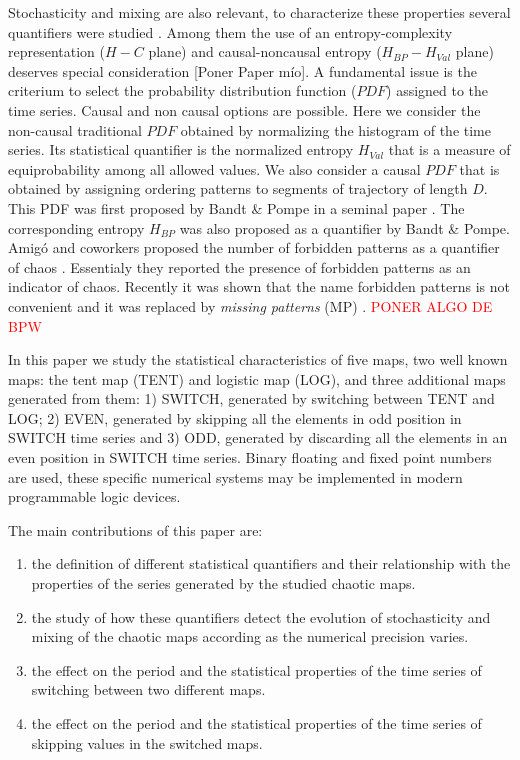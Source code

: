 Stochasticity and mixing are also relevant, to characterize these properties several quantifiers were studied \cite{DeMicco2009}.
Among them the use of an entropy-complexity representation ($H-C$ plane) and causal-noncausal entropy ($H_{BP}-H_{Val}$ plane) deserves special consideration \cite{Rosso2007C,DeMicco2008,DeMicco2011,DeMicco2009,Rosso2009}[Poner Paper mío].
A fundamental issue is the criterium to select the probability distribution function ($PDF$) assigned to the time series.
Causal and non causal options are possible.
Here we consider the non-causal traditional $PDF$ obtained by normalizing the histogram of the time series.
Its statistical quantifier is the normalized entropy $H_{Val}$ that is a measure of equiprobability among all allowed values.
We also consider a causal $PDF$ that is obtained by assigning ordering patterns to segments of trajectory of length $D$.
This PDF was first proposed by Bandt \& Pompe in a seminal paper \cite{Pompe2002}.
The corresponding entropy $H_{BP}$ was also proposed as a quantifier by Bandt \& Pompe.
Amig\'o and coworkers proposed the number of forbidden patterns as a quantifier of chaos \cite{Amigo2007b}.
Essentialy they reported the presence of forbidden patterns as an indicator of chaos.
Recently it was shown that the name forbidden patterns is not convenient and it was replaced by \textit{missing patterns }(MP) \cite{Rosso2012b}.
\textcolor{red}{PONER ALGO DE BPW}

In this paper we study the statistical characteristics of five maps, two well known maps: the tent map (TENT) and logistic map (LOG), and three additional maps generated from them: 1) SWITCH, generated by switching between TENT and LOG; 2) EVEN, generated by skipping all the elements in odd position in SWITCH time series and 3) ODD, generated by discarding all the elements in an even position in SWITCH time series.
Binary floating and fixed point numbers are used, these specific numerical systems may be implemented in modern programmable logic devices.

The main contributions of this paper are:
\begin{enumerate}
\item the definition of different statistical quantifiers and their relationship with the properties of the series generated by the studied chaotic maps.
\item the study of how these quantifiers detect the evolution of stochasticity and mixing of the chaotic maps according as the numerical precision varies.
\item the effect on the period and the statistical properties of the time series of switching between two different maps.
\item the effect on the period and the statistical properties of the time series of skipping values in the switched maps.
\end{enumerate}

